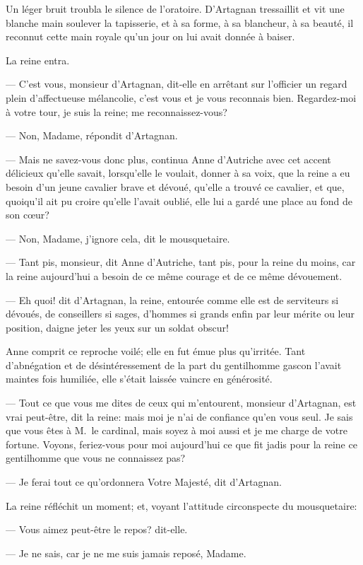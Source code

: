 Un léger bruit troubla le silence de l'oratoire. D'Artagnan tressaillit et vit une blanche main soulever la tapisserie, et à sa forme, à sa blancheur, à sa beauté, il reconnut cette main royale qu'un jour on lui avait donnée à baiser.

La reine entra.

— C'est vous, monsieur d'Artagnan, dit-elle en arrêtant sur l'officier un regard plein d'affectueuse mélancolie, c'est vous et je vous reconnais bien. Regardez-moi à votre tour, je suis la reine; me reconnaissez-vous?

— Non, Madame, répondit d'Artagnan.

— Mais ne savez-vous donc plus, continua Anne d'Autriche avec cet accent délicieux qu'elle savait, lorsqu'elle le voulait, donner à sa voix, que la reine a eu besoin d'un jeune cavalier brave et dévoué, qu'elle a trouvé ce cavalier, et que, quoiqu'il ait pu croire qu'elle l'avait oublié, elle lui a gardé une place au fond de son cœur?

— Non, Madame, j'ignore cela, dit le mousquetaire.

— Tant pis, monsieur, dit Anne d'Autriche, tant pis, pour la reine du moins, car la reine aujourd'hui a besoin de ce même courage et de ce même dévouement.

— Eh quoi! dit d'Artagnan, la reine, entourée comme elle est de serviteurs si dévoués, de conseillers si sages, d'hommes si grands enfin par leur mérite ou leur position, daigne jeter les yeux sur un soldat obscur!

Anne comprit ce reproche voilé; elle en fut émue plus qu'irritée. Tant d'abnégation et de désintéressement de la part du gentilhomme gascon l'avait maintes fois humiliée, elle s'était laissée vaincre en générosité.

— Tout ce que vous me dites de ceux qui m'entourent, monsieur d'Artagnan, est vrai peut-être, dit la reine: mais moi je n'ai de confiance qu'en vous seul. Je sais que vous êtes à M.~le cardinal, mais soyez à moi aussi et je me charge de votre fortune. Voyons, feriez-vous pour moi aujourd'hui ce que fit jadis pour la reine ce gentilhomme que vous ne connaissez pas?

— Je ferai tout ce qu'ordonnera Votre Majesté, dit d'Artagnan.

La reine réfléchit un moment; et, voyant l'attitude circonspecte du mousquetaire:

— Vous aimez peut-être le repos? dit-elle.

— Je ne sais, car je ne me suis jamais reposé, Madame.

